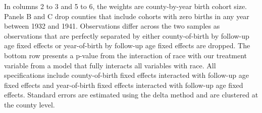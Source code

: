 \documentclass[12pt]{article}
\begin{document}
\begin{landscape}
\begin{table}[ht]
\begin{adjustbox}{width=0.8\textwidth}
\begin{threeparttable}
{            In columns 2 to 3 and 5 to 6, the weights are county-by-year birth cohort size.
            Panels B and C drop counties that include cohorts with zero births in any year between 1932 and 1941. 
            Observations differ across the two samples as observations that are perfectly separated by either county-of-birth by follow-up age fixed effects or year-of-birth by follow-up age fixed effects are dropped. 
            The bottom row presents a p-value from the interaction of race with our treatment variable from a model that fully interacts all variables with race. 
            All specifications include county-of-birth fixed effects interacted with follow-up age fixed effects and year-of-birth fixed effects interacted with follow-up age fixed effects. 
		  Standard errors are estimated using the delta method and are clustered at the county level.
        }
    \end{threeparttable}
   \end{adjustbox}
\end{table}
\end{landscape}
\restoregeometry
\end{document}
